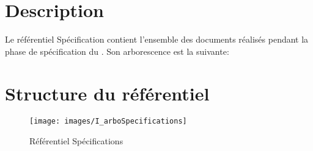 \section{Description}

Le référentiel Spécification contient l’ensemble des documents réalisés pendant la phase de spécification du \PICCourt. Son arborescence est la suivante:

\section{Structure du référentiel}

\begin{figure}[ht]
         \begin{center}
         \texttt{[image: images/I\_arboSpecifications]}
         \end{center}
         \caption{Référentiel Spécifications}
 \end{figure}
